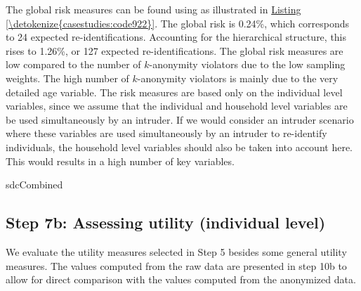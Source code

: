 \documentclass[letterpaper,10pt,english]{sphinxmanual}
\begin{document}
The global risk measures can be found using  as illustrated in
\hyperref[\detokenize{casestudies:code922}]{Listing \ref{\detokenize{casestudies:code922}}}. The global risk is 0.24\%, which corresponds to 24 expected
re-identifications. Accounting for the hierarchical structure, this
rises to 1.26\%, or 127 expected re-identifications. The global risk
measures are low compared to the number of \(k\)-anonymity violators due to
the low sampling weights. The high number of \(k\)-anonymity violators is
mainly due to the very detailed age variable. The risk measures are
based only on the individual level variables, since we assume that the
individual and household level variables are be used simultaneously by
an intruder. If we would consider an intruder scenario where these
variables are used simultaneously by an intruder to re-identify
individuals, the household level variables should also be taken into
account here. This would results in a high number of key variables.

\def\sphinxLiteralBlockLabel{\label{\detokenize{casestudies:code922}}}
%
\begin{sphinxVerbatim}[commandchars=\\\{\},numbers=left,firstnumber=1,stepnumber=1]
sdcCombined 
\end{sphinxVerbatim}


\subsection{Step 7b: Assessing utility (individual level)}
\label{\detokenize{casestudies:step-7b-assessing-utility-individual-level}}
We evaluate the utility measures selected in Step 5 besides some general
utility measures. The values computed from the raw data are presented in
step 10b to allow for direct comparison with the values computed from
the anonymized data.
\end{document}

